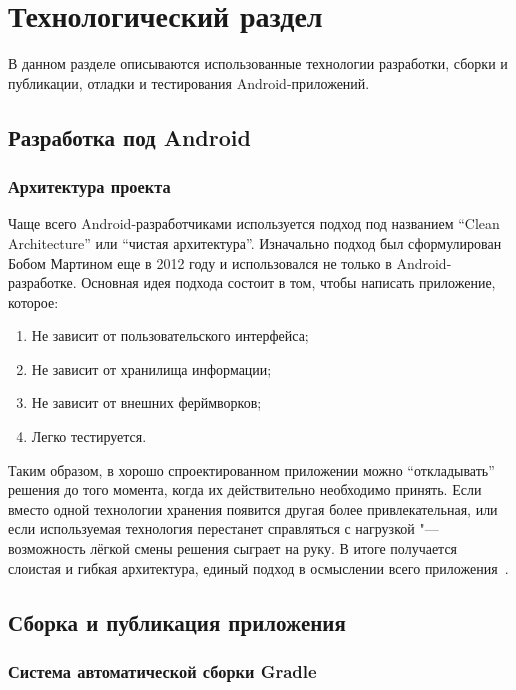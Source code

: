 \chapter{Технологический раздел}
\label{ch:tech}
В данном разделе описываются использованные технологии разработки, сборки и публикации, отладки и тестирования Android-приложений.

\section{Разработка под Android}
\label{sec:dev}

\subsection{Архитектура проекта}
\label{subsec:arch}

Чаще всего Android-разработчиками используется подход под названием ``Clean Architecture'' или ``чистая архитектура''.
Изначально подход был сформулирован Бобом Мартином еще в 2012 году\cite{martin:clean} и использовался не только в Android-разработке.
Основная идея подхода состоит в том, чтобы написать приложение, которое:
\begin{enumerate}
  \item Не зависит от пользовательского интерфейса;
  \item Не зависит от хранилища информации;
  \item Не зависит от внешних ферймворков;
  \item Легко тестируется.
\end{enumerate}

Таким образом, в хорошо спроектированном приложении можно ``откладывать'' решения до того момента, когда их действительно необходимо принять.
Если вместо одной технологии хранения появится другая более привлекательная, или если используемая технология перестанет справляться с нагрузкой "--- возможность лёгкой смены решения сыграет на руку.
В итоге получается слоистая и гибкая архитектура, единый подход в осмыслении всего приложения~\cite{gihub:androidArch}.


\section{Сборка и публикация приложения}
\label{sec:build}

\subsection{Система автоматической сборки Gradle}
\label{subsec:gradle}

